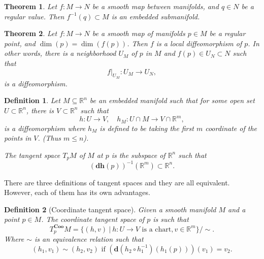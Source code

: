 \documentclass{article}
\newtheorem{theorem}{Theorem}[section]
\newtheorem{definition}{Definition}[section]
\numberwithin{equation}{section}
\begin{document}
\begin{theorem}
Let $f:M\to N$ be a smooth map between manifolds, and $q\in N$ be a regular value. Then $f^{-1}(q)\subset M$ is an embedded submanifold.
\end{theorem}

\begin{theorem}
Let $f:M\to N$ be a smooth map of manifolds $p\in M$ be a regular point, and $\dim(p) = \dim(f(p))$. Then $f$ is a local diffeomorphism of $p$. In other words, there is a neighborhood $U_M$ of $p$ in $M$ and $f(p)\in U_N\subset N$ such that
\begin{equation*}
f|_{U_M}:U_M\to U_N,
\end{equation*}
is a diffeomorphism. 
\end{theorem}

\begin{definition}
Let $M\subseteq \mathbb{R}^n$ be an embedded manifold such that for some open set $U\subset\mathbb{R}^n$, there is $V\subset\mathbb{R}^n$ such that
\begin{equation*}
h:U\to V, \quad h_M:U\cap M\to V\cap \mathbb{R}^m,
\end{equation*}
is a diffeomorphism where $h_M$ is defined to be taking the first $m$ coordinate of the points in $V$. (Thus $m\leq n$).\\
\par The tangent space $T_pM$ of $M$ at $p$ is the subspace of $\mathbb{R}^n$ such that
\begin{equation*}
(\mathbf{dh}(p))^{-1}(\mathbb{R}^m)\subset\mathbb{R}^n.
\end{equation*}
\end{definition}

There are three definitions of tangent spaces and they are all equivalent. However, each of them has its own advantages. 

\begin{definition}[Coordinate tangent space]
Given a smooth manifold $M$ and a point $p\in M$. The coordinate tangent space of $p$ is such that
\begin{equation*}
T_p^{\mathbf{Coo}}M = \{(h,v)\:|\: h:U\to V\text{ is a chart}, v\in\mathbb{R}^m\}/\sim.
\end{equation*}
Where $\sim$ is an equivalence relation such that
\begin{equation*}
(h_1,v_1)\sim (h_2,v_2)\text{ if } (\mathbf{d}(h_2\circ h_1^{-1})(h_1(p)))(v_1) = v_2.
\end{equation*}
\end{definition}
\end{document}
